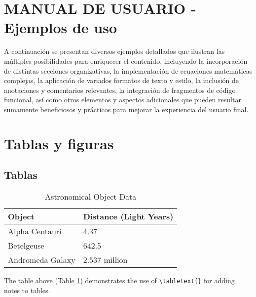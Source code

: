 
\section*{MANUAL DE USUARIO - Ejemplos de uso}

A continuación se presentan diversos ejemplos detallados que ilustran las múltiples posibilidades para enriquecer el contenido, incluyendo la incorporación de distintas secciones organizativas, 
la implementación de ecuaciones matemáticas complejas, la aplicación de variados formatos de texto y estilo, la inclusión de anotaciones y comentarios relevantes, la integración de fragmentos 
de código funcional, así como otros elementos y aspectos adicionales que pueden resultar sumamente beneficiosos y prácticos para mejorar la experiencia del usuario final.

\section*{Tablas y figuras}

    \subsection*{Tablas}
        \begin{table}[H]
            \centering
            \caption{Astronomical Object Data}
            \label{tab:table}
            \begin{tabular}{ll}
                \toprule
                \textbf{Object} & \textbf{Distance (Light Years)} \\
                \midrule
                Alpha Centauri & 4.37 \\
                Betelgeuse & 642.5 \\
                Andromeda Galaxy & 2.537 million \\
                \bottomrule   
            \end{tabular}
        \end{table}

        The table above (Table \ref{tab:table}) demonstrates the use of \verb|\tabletext{}| for adding notes to tables. 

